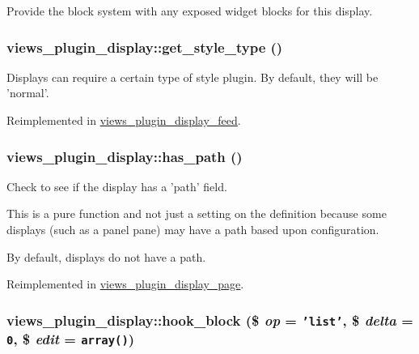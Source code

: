 Provide the block system with any exposed widget blocks for this display. \hypertarget{classviews__plugin__display_03f77cb37c3c3219d031c153aa59d20e}{
\subsubsection[{get\_\-style\_\-type}]{\setlength{\rightskip}{0pt plus 5cm}views\_\-plugin\_\-display::get\_\-style\_\-type ()}}
\label{classviews__plugin__display_03f77cb37c3c3219d031c153aa59d20e}


Displays can require a certain type of style plugin. By default, they will be 'normal'. 

Reimplemented in \hyperlink{classviews__plugin__display__feed_9a7886409056fe5906021a70d2f41c14}{views\_\-plugin\_\-display\_\-feed}.\hypertarget{classviews__plugin__display_08fe612e61fe35f549f0ec9a1fe8d953}{
\subsubsection[{has\_\-path}]{\setlength{\rightskip}{0pt plus 5cm}views\_\-plugin\_\-display::has\_\-path ()}}
\label{classviews__plugin__display_08fe612e61fe35f549f0ec9a1fe8d953}


Check to see if the display has a 'path' field.

This is a pure function and not just a setting on the definition because some displays (such as a panel pane) may have a path based upon configuration.

By default, displays do not have a path. 

Reimplemented in \hyperlink{classviews__plugin__display__page_6ab3df375279fc7308aea96e3f08f833}{views\_\-plugin\_\-display\_\-page}.\hypertarget{classviews__plugin__display_15bc6f2b36a1018456fbec532aaa9e05}{
\subsubsection[{hook\_\-block}]{\setlength{\rightskip}{0pt plus 5cm}views\_\-plugin\_\-display::hook\_\-block (\$ {\em op} = {\tt 'list'}, \/  \$ {\em delta} = {\tt 0}, \/  \$ {\em edit} = {\tt array()})}}
\label{classviews__plugin__display_15bc6f2b36a1018456fbec532aaa9e05}


